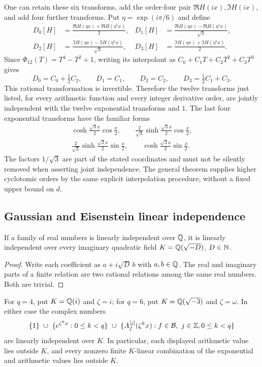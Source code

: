 One can retain these six transforms, add the order-four pair
$\Re H(ix),\Im H(ix)$, and add four further transforms.  Put
$\eta=\exp(i\pi/6)$ and define
\begin{align*}
 D_0[H]&=\frac{\Re H(\eta x)+\Re H(\eta^5x)}2,&
 D_1[H]&=\frac{\Re H(\eta x)-\Re H(\eta^5x)}{\sqrt3},\\
 D_2[H]&=\frac{\Im H(\eta x)-\Im H(\eta^5x)}{\sqrt3},&
 D_3[H]&=\frac{\Im H(\eta x)+\Im H(\eta^5x)}2.
\end{align*}
Since $\Phi_{12}(T)=T^4-T^2+1$, writing its interpolant as
$C_0+C_1T+C_2T^2+C_3T^3$ gives
\[
 D_0=C_0+\tfrac12 C_2,\qquad D_1=C_1,\qquad
 D_2=C_2,\qquad D_3=\tfrac12 C_1+C_3.
\]
This rational transformation is invertible.  Therefore the twelve
transforms just listed, for every arithmetic function and every
integer derivative order, are jointly independent with the twelve
exponential transforms and $1$.
The last four exponential transforms have the familiar forms
\begin{gather*}
 \cosh\frac{\sqrt3x}{2}\cos\frac x2,\qquad
 \frac2{\sqrt3}\sinh\frac{\sqrt3x}{2}\cos\frac x2,\\
 \frac2{\sqrt3}\sinh\frac{\sqrt3x}{2}\sin\frac x2,\qquad
 \cosh\frac{\sqrt3x}{2}\sin\frac x2.
\end{gather*}
The factors $1/\sqrt3$ are part of the stated coordinates and must
not be silently removed when asserting joint independence.
The general theorem supplies higher cyclotomic orders by the same
explicit interpolation procedure, without a fixed upper bound on $d$.

\subsection{Gaussian and Eisenstein linear independence}

\begin{lemma}
\label{lem:imaginary-quadratic-v5}
If a family of real numbers is linearly independent over $\mathbb Q$, it
is linearly independent over every imaginary quadratic field
$K=\mathbb Q(\sqrt{-D})$, $D\in\mathbb N$.
\end{lemma}
\begin{proof}
Write each coefficient as $a+i\sqrt D\,b$ with $a,b\in\mathbb Q$.
The real and imaginary parts of a finite relation are two rational
relations among the same real numbers.  Both are trivial.
\end{proof}

\begin{corollary}
\label{cor:quadratic-angular-v5}
For $q=4$, put $K=\mathbb Q(i)$ and $\zeta=i$; for $q=6$, put
$K=\mathbb Q(\sqrt{-3})$ and $\zeta=\omega$.
In either case the complex numbers
\[
 \{1\}\ \cup\ \{e^{\zeta^k x}:0\leq k<q\}
 \ \cup\
 \{A_f^{[j]}(\zeta^k x):f\in\mathcal B,\ j\in\Z,
                              0\leq k<q\}
\]
are linearly independent over $K$.
In particular, each displayed arithmetic value lies outside $K$,
and every nonzero finite $K$-linear combination of the exponential
and arithmetic values lies outside $K$.
\end{corollary}

